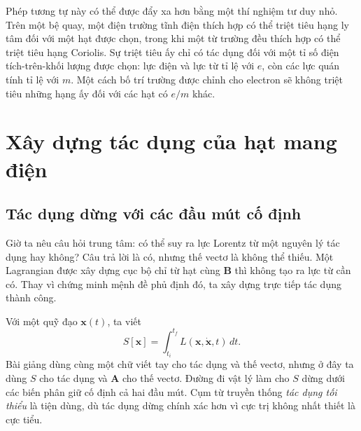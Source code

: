 \begin{classroomqa}
\end{classroomqa}

Phép tương tự này có thể được đẩy xa hơn bằng một thí nghiệm tư duy nhỏ. Trên một bệ quay, một điện trường tĩnh điện thích hợp có thể triệt tiêu hạng ly tâm đối với một hạt được chọn, trong khi một từ trường đều thích hợp có thể triệt tiêu hạng Coriolis. Sự triệt tiêu ấy chỉ có tác dụng đối với một tỉ số điện tích-trên-khối lượng được chọn: lực điện và lực từ tỉ lệ với \(e\), còn các lực quán tính tỉ lệ với \(m\). Một cách bố trí trường được chỉnh cho electron sẽ không triệt tiêu những hạng ấy đối với các hạt có \(e/m\) khác.

\section{Xây dựng tác dụng của hạt mang điện}

\subsection{Tác dụng dừng với các đầu mút cố định}

Giờ ta nêu câu hỏi trung tâm: có thể suy ra lực Lorentz từ một nguyên lý tác dụng hay không? Câu trả lời là có, nhưng thế vectơ là không thể thiếu. Một Lagrangian được xây dựng cục bộ chỉ từ hạt cùng \(\mathbf B\) thì không tạo ra lực từ cần có. Thay vì chứng minh mệnh đề phủ định đó, ta xây dựng trực tiếp tác dụng thành công.

Với một quỹ đạo \(\mathbf x(t)\), ta viết
\begin{equation}
  S[\mathbf x]
  =
  \int_{t_i}^{t_f}L(\mathbf x,\dot{\mathbf x},t)\,dt.
\end{equation}
Bài giảng dùng cùng một chữ viết tay cho tác dụng và thế vectơ, nhưng ở đây ta dùng \(S\) cho tác dụng và \(\mathbf A\) cho thế vectơ. Đường đi vật lý làm cho \(S\) dừng dưới các biến phân giữ cố định cả hai đầu mút. Cụm từ truyền thống \emph{tác dụng tối thiểu} là tiện dùng, dù tác dụng dừng chính xác hơn vì cực trị không nhất thiết là cực tiểu.

